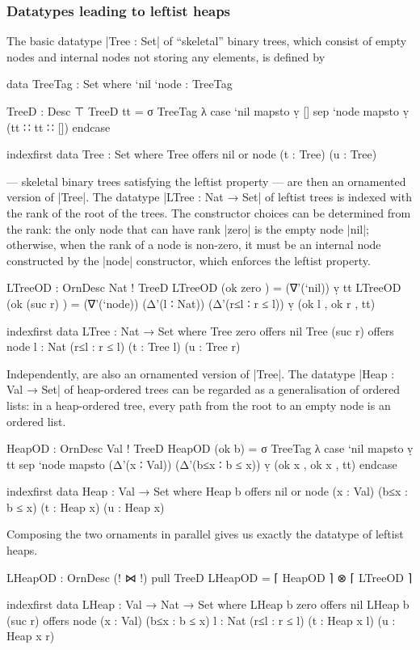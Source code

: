 \subsubsection{Datatypes leading to leftist heaps}

The basic datatype |Tree : Set| of ``skeletal'' binary trees, which consist of empty nodes and internal nodes not storing any elements, is defined by
\begin{code}
data TreeTag : Set where `nil `node : TreeTag

TreeD : Desc ⊤
TreeD tt = σ TreeTag λ  case  `nil   mapsto  ṿ []
                        sep   `node  mapsto  ṿ (tt ∷ tt ∷ []) endcase

indexfirst data Tree : Set where
  Tree  offers  nil
        or      node (t : Tree) (u : Tree)
\end{code}
 --- skeletal binary trees satisfying the leftist property --- are then an ornamented version of |Tree|.
The datatype |LTree : Nat → Set| of leftist trees is indexed with the rank of the root of the trees.
The constructor choices can be determined from the rank: the only node that can have rank |zero| is the empty node |nil|; otherwise, when the rank of a node is non-zero, it must be an internal node constructed by the |node| constructor, which enforces the leftist property.
\begin{code}
LTreeOD : OrnDesc Nat ! TreeD
LTreeOD (ok zero     )   =  (∇'(`nil)) ṿ tt
LTreeOD (ok (suc r)  )   =  (∇'(`node)) (Δ'(l ∶ Nat)) (Δ'(r≤l ∶ r ≤ l)) ṿ (ok l , ok r , tt)

indexfirst data LTree : Nat → Set where
  Tree zero     offers  nil
  Tree (suc r)  offers  node {l : Nat} (r≤l : r ≤ l) (t : Tree l) (u : Tree r)
\end{code}
Independently,  are also an ornamented version of |Tree|.
The datatype |Heap : Val → Set| of heap-ordered trees can be regarded as a generalisation of ordered lists: in a heap-ordered tree, every path from the root to an empty node is an ordered list.
\begin{code}
HeapOD : OrnDesc Val ! TreeD
HeapOD (ok b) =
  σ TreeTag  λ  case  `nil   mapsto  ṿ tt
                sep   `node  mapsto  (Δ'(x ∶ Val)) (Δ'(b≤x ∶ b ≤ x)) ṿ (ok x , ok x , tt) endcase

indexfirst data Heap : Val → Set where
  Heap b  offers  nil
          or      node (x : Val) (b≤x : b ≤ x) (t : Heap x) (u : Heap x)
\end{code}
Composing the two ornaments in parallel gives us exactly the datatype of leftist heaps.
\begin{code}
LHeapOD : OrnDesc (! ⋈ !) pull TreeD
LHeapOD = ⌈ HeapOD ⌉ ⊗ ⌈ LTreeOD ⌉

indexfirst data LHeap : Val → Nat → Set where
  LHeap b zero     offers  nil
  LHeap b (suc r)  offers  node  (x : Val) (b≤x : b ≤ x)
                                 {l : Nat} (r≤l : r ≤ l) (t : Heap x l) (u : Heap x r)
\end{code}

